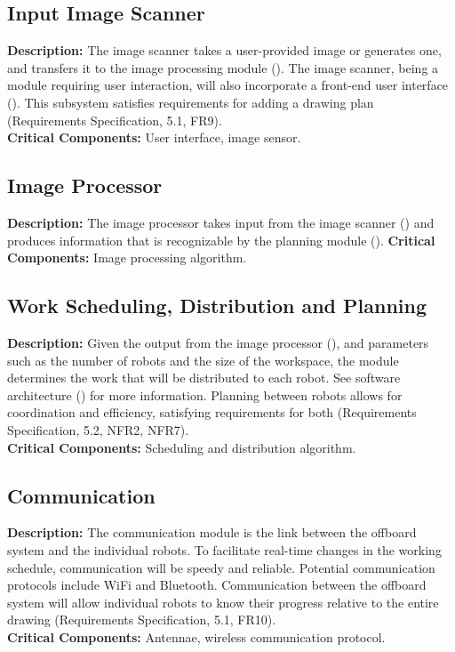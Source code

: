 \subsection{Input Image Scanner}
\label{sec:subsystem_input_scanner}
\textbf{Description:} The image scanner takes a user-provided image or generates one, and transfers it to the image processing module (). The image scanner, being a module requiring user interaction, will also incorporate a front-end user interface (). This subsystem satisfies requirements for adding a drawing plan (Requirements Specification, 5.1, FR9).\\
\textbf{Critical Components:} User interface, image sensor.\\

\subsection{Image Processor}
\label{sec:subsystem_image_processor}
\textbf{Description:} The image processor takes input from the image scanner () and produces information that is recognizable by the planning module (). 
\textbf{Critical Components:} Image processing algorithm.

\subsection{Work Scheduling, Distribution and Planning}
\label{sec:subsystem_planner}
\textbf{Description:} Given the output from the image processor (), and parameters such as the number of robots and the size of the workspace, the module determines the work that will be distributed to each robot. See software architecture () for more information. Planning between robots allows for coordination and efficiency, satisfying requirements for both (Requirements Specification, 5.2, NFR2, NFR7).\\
\textbf{Critical Components:} Scheduling and distribution algorithm.\\

\subsection{Communication}
\label{sec:subsystem_communication}
\textbf{Description:} The communication module is the link between the offboard system and the individual robots. To facilitate real-time changes in the working schedule, communication will be speedy and reliable. Potential communication protocols include WiFi and Bluetooth. Communication between the offboard system will allow individual robots to know their progress relative to the entire drawing (Requirements Specification, 5.1, FR10).\\
\textbf{Critical Components:} Antennae, wireless communication protocol.\\

